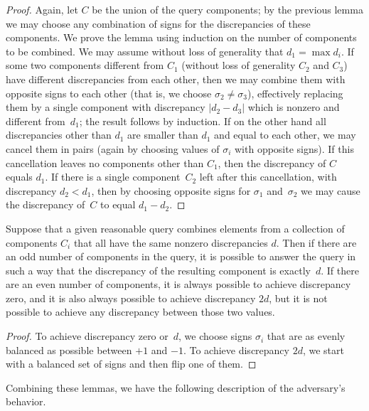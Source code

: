 \documentclass[11pt]{llncs}
\begin{document}
\begin{proof}
Again, let $C$ be the union of the query components; by the previous lemma we may choose any combination of signs for the discrepancies of these components.
We prove the lemma using induction on the number of components to be combined. We may assume without loss of generality that $d_1=\max d_i$. If some two components different from $C_1$ (without loss of generality $C_2$ and $C_3$) have different discrepancies from each other, then we may combine them with opposite signs to each other (that is, we choose $\sigma_2\ne\sigma_3$), effectively replacing them by a single component with discrepancy $|d_2-d_3|$ which is nonzero and different from~$d_1$; the result follows by induction. If on the other hand all discrepancies other than $d_1$ are smaller than $d_1$ and equal to each other, we may cancel them in pairs (again by choosing values of $\sigma_i$ with opposite signs). If this cancellation leaves no components other than $C_1$, then the discrepancy of $C$ equals $d_1$. If there is a single component~$C_2$ left after this cancellation, with discrepancy $d_2<d_1$, then by choosing opposite signs for $\sigma_1$ and~$\sigma_2$ we may cause the discrepancy of~$C$ to equal $d_1-d_2$.
\end{proof}

\begin{lemma}
Suppose that a given reasonable query combines elements from a collection of components $C_i$ that all have the same nonzero discrepancies $d$. Then if there are an odd number of components in the query, it is possible to answer the query in such a way that the discrepancy of the resulting component is exactly~$d$. If there are an even number of components, it is always possible to achieve discrepancy zero, and it is also always possible to achieve discrepancy $2d$, but it is not possible to achieve any discrepancy between those two values.
\end{lemma}

\begin{proof}
To achieve discrepancy zero or~$d$, we choose signs $\sigma_i$ that are as evenly balanced as possible between $+1$ and $-1$. To achieve discrepancy $2d$, we start with a balanced set of signs and then flip one of them.
\end{proof}

Combining these lemmas, we have the following description of the adversary's behavior.
\end{document}
